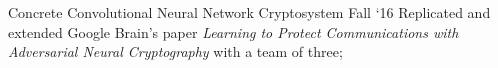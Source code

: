 \project
    {Concrete Convolutional Neural Network Cryptosystem}
    {Fall `16}
    {
        Replicated and extended Google Brain's paper \textit{Learning to Protect Communications with
        Adversarial Neural Cryptography} with a team of three;
    }
